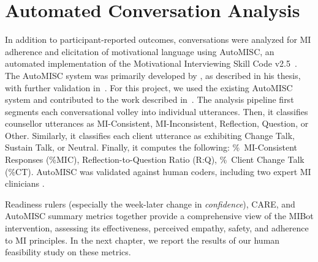 \section{Automated Conversation Analysis}
\label{subsec:automisc}
In addition to participant-reported outcomes, conversations were analyzed for MI adherence and elicitation of motivational language using AutoMISC, an automated implementation of the Motivational Interviewing Skill Code v2.5~\citep{Houck2010}. The AutoMISC system was primarily developed by \citet{ali2025thesis}, as described in his thesis, with further validation in~\citep{ali2025automated}. For this project, we used the existing AutoMISC system and contributed to the work described in~\citep{mahmood-etal-2025-fully}. The analysis pipeline first segments each conversational volley into individual utterances. Then, it classifies counsellor utterances as MI-Consistent, MI-Inconsistent, Reflection, Question, or Other. Similarly, it classifies each client utterance as exhibiting Change Talk, Sustain Talk, or Neutral. Finally, it computes the following: \%~MI-Consistent Responses (\%MIC), Reflection-to-Question Ratio (R:Q), \%~Client Change Talk (\%CT). AutoMISC was validated against human coders, including two expert MI clinicians \citep{mahmood-etal-2025-fully}.

Readiness rulers (especially the week-later change in \emph{confidence}), CARE, and
AutoMISC summary metrics together provide a comprehensive view of the MIBot
intervention, assessing its effectiveness, perceived empathy, safety, and adherence to
MI principles. In the next chapter, we report the results of our human feasibility
study on these metrics.
